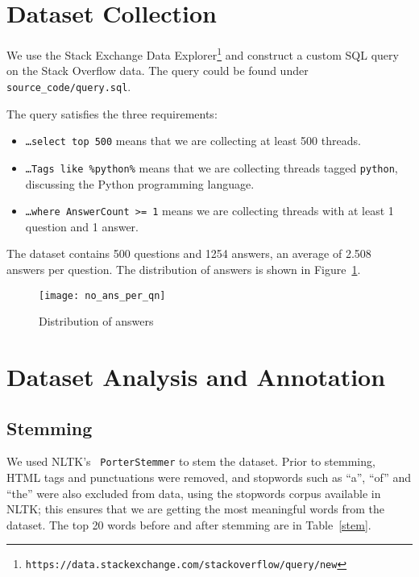 \section{Dataset Collection}

We use the Stack Exchange Data
Explorer\footnote{\texttt{https://data.stackexchange.com/stackoverflow/query/new}}
and construct a custom SQL query on the Stack Overflow data. The query could be
found under \texttt{source\_code/query.sql}.

The query satisfies the three requirements:

\begin{itemize}
    \item \texttt{\ldots select top 500} means that we are collecting at least
    500 threads.
    \item \texttt{\ldots Tags like \textquotesingle{}\%python\%\textquotesingle{}}
    means that we are collecting threads tagged \texttt{python}, discussing the
    Python programming language.
    \item \texttt{\ldots where AnswerCount >= 1} means we are collecting
    threads with at least 1 question and 1 answer.
\end{itemize}

The dataset contains 500 questions and 1254 answers, an average of 2.508 answers
per question. The distribution of answers is shown in Figure~\ref{ans-dist}.

\begin{figure}[h]
\texttt{[image: no\_ans\_per\_qn]}
\caption{Distribution of answers}\label{ans-dist}
\end{figure}

\section{Dataset Analysis and Annotation}

\subsection{Stemming}

We used NLTK's~\cite{nltk} \texttt{PorterStemmer} to stem the dataset.
Prior to stemming, HTML tags and punctuations were removed, and stopwords
such as ``a'', ``of'' and ``the'' were also excluded from data, using the
stopwords corpus available in NLTK\@; this ensures that we are getting the
most meaningful words from the dataset. The top 20 words before and after
stemming are in Table~\ref{stem}.

